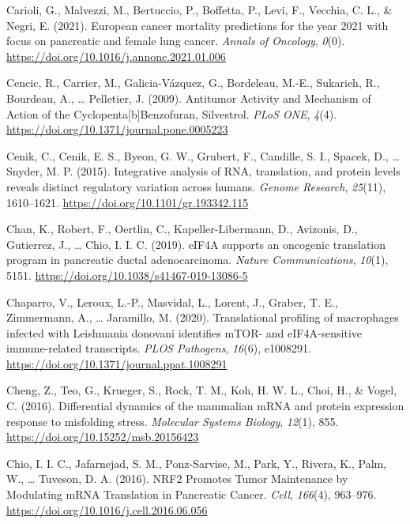 \documentclass[12pt,openany]{book}
\begin{document}
\hypertarget{ref-Carioli2021}{}
Carioli, G., Malvezzi, M., Bertuccio, P., Boffetta, P., Levi, F.,
Vecchia, C. L., \& Negri, E. (2021). European cancer mortality
predictions for the year 2021 with focus on pancreatic and female lung
cancer. \emph{Annals of Oncology}, \emph{0}(0).
\url{https://doi.org/10.1016/j.annonc.2021.01.006}

\hypertarget{ref-Cencic2009}{}
Cencic, R., Carrier, M., Galicia-Vázquez, G., Bordeleau, M.-E.,
Sukarieh, R., Bourdeau, A., \ldots{} Pelletier, J. (2009). Antitumor
Activity and Mechanism of Action of the Cyclopenta{[}b{]}Benzofuran,
Silvestrol. \emph{PLoS ONE}, \emph{4}(4).
\url{https://doi.org/10.1371/journal.pone.0005223}

\hypertarget{ref-Cenik2015}{}
Cenik, C., Cenik, E. S., Byeon, G. W., Grubert, F., Candille, S. I.,
Spacek, D., \ldots{} Snyder, M. P. (2015). Integrative analysis of RNA,
translation, and protein levels reveals distinct regulatory variation
across humans. \emph{Genome Research}, \emph{25}(11), 1610--1621.
\url{https://doi.org/10.1101/gr.193342.115}

\hypertarget{ref-Chan2019}{}
Chan, K., Robert, F., Oertlin, C., Kapeller-Libermann, D., Avizonis, D.,
Gutierrez, J., \ldots{} Chio, I. I. C. (2019). eIF4A supports an
oncogenic translation program in pancreatic ductal adenocarcinoma.
\emph{Nature Communications}, \emph{10}(1), 5151.
\url{https://doi.org/10.1038/s41467-019-13086-5}

\hypertarget{ref-Chaparro2020}{}
Chaparro, V., Leroux, L.-P., Masvidal, L., Lorent, J., Graber, T. E.,
Zimmermann, A., \ldots{} Jaramillo, M. (2020). Translational profiling
of macrophages infected with Leishmania donovani identifies mTOR- and
eIF4A-sensitive immune-related transcripts. \emph{PLOS Pathogens},
\emph{16}(6), e1008291.
\url{https://doi.org/10.1371/journal.ppat.1008291}

\hypertarget{ref-Cheng2016}{}
Cheng, Z., Teo, G., Krueger, S., Rock, T. M., Koh, H. W. L., Choi, H.,
\& Vogel, C. (2016). Differential dynamics of the mammalian mRNA and
protein expression response to misfolding stress. \emph{Molecular
Systems Biology}, \emph{12}(1), 855.
\url{https://doi.org/10.15252/msb.20156423}

\hypertarget{ref-Chio2016}{}
Chio, I. I. C., Jafarnejad, S. M., Ponz-Sarvise, M., Park, Y., Rivera,
K., Palm, W., \ldots{} Tuveson, D. A. (2016). NRF2 Promotes Tumor
Maintenance by Modulating mRNA Translation in Pancreatic Cancer.
\emph{Cell}, \emph{166}(4), 963--976.
\url{https://doi.org/10.1016/j.cell.2016.06.056}
\end{document}
